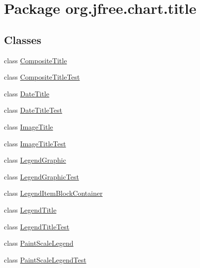 \hypertarget{namespaceorg_1_1jfree_1_1chart_1_1title}{}\section{Package org.\+jfree.\+chart.\+title}
\label{namespaceorg_1_1jfree_1_1chart_1_1title}
\subsection*{Classes}
\begin{DoxyCompactItemize}
\item 
class \mbox{\hyperlink{classorg_1_1jfree_1_1chart_1_1title_1_1_composite_title}{Composite\+Title}}
\item 
class \mbox{\hyperlink{classorg_1_1jfree_1_1chart_1_1title_1_1_composite_title_test}{Composite\+Title\+Test}}
\item 
class \mbox{\hyperlink{classorg_1_1jfree_1_1chart_1_1title_1_1_date_title}{Date\+Title}}
\item 
class \mbox{\hyperlink{classorg_1_1jfree_1_1chart_1_1title_1_1_date_title_test}{Date\+Title\+Test}}
\item 
class \mbox{\hyperlink{classorg_1_1jfree_1_1chart_1_1title_1_1_image_title}{Image\+Title}}
\item 
class \mbox{\hyperlink{classorg_1_1jfree_1_1chart_1_1title_1_1_image_title_test}{Image\+Title\+Test}}
\item 
class \mbox{\hyperlink{classorg_1_1jfree_1_1chart_1_1title_1_1_legend_graphic}{Legend\+Graphic}}
\item 
class \mbox{\hyperlink{classorg_1_1jfree_1_1chart_1_1title_1_1_legend_graphic_test}{Legend\+Graphic\+Test}}
\item 
class \mbox{\hyperlink{classorg_1_1jfree_1_1chart_1_1title_1_1_legend_item_block_container}{Legend\+Item\+Block\+Container}}
\item 
class \mbox{\hyperlink{classorg_1_1jfree_1_1chart_1_1title_1_1_legend_title}{Legend\+Title}}
\item 
class \mbox{\hyperlink{classorg_1_1jfree_1_1chart_1_1title_1_1_legend_title_test}{Legend\+Title\+Test}}
\item 
class \mbox{\hyperlink{classorg_1_1jfree_1_1chart_1_1title_1_1_paint_scale_legend}{Paint\+Scale\+Legend}}
\item 
class \mbox{\hyperlink{classorg_1_1jfree_1_1chart_1_1title_1_1_paint_scale_legend_test}{Paint\+Scale\+Legend\+Test}}
\item 

\end{DoxyCompactItemize}
